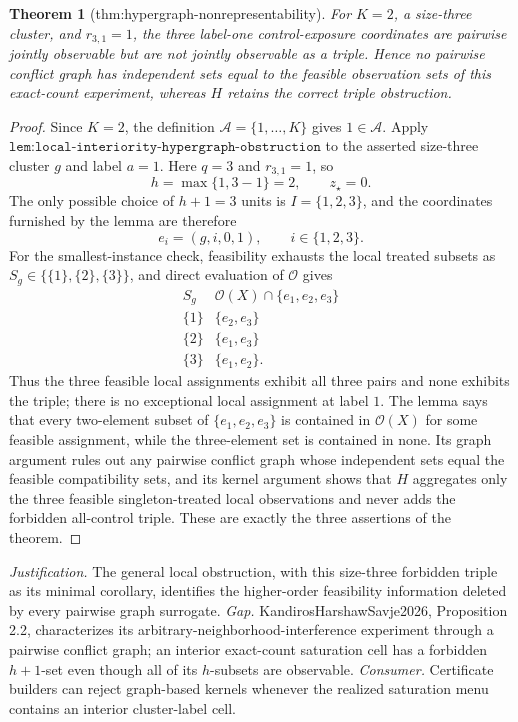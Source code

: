 \documentclass{article}
\newtheorem{theorem}{Theorem}
\begin{document}
\begin{theorem}[thm:hypergraph-nonrepresentability]\label{thm:hypergraph-nonrepresentability}
For \(K=2\), a size-three cluster, and \(r_{3,1}=1\), the three label-one control-exposure coordinates are pairwise jointly observable but are not jointly observable as a triple. Hence no pairwise conflict graph has independent sets equal to the feasible observation sets of this exact-count experiment, whereas \(H\) retains the correct triple obstruction.
\end{theorem}
\begin{proof}
Since \(K=2\), the definition \(\mathcal A=\{1,\ldots,K\}\) gives \(1\in\mathcal A\).  Apply \(\texttt{lem:local-interiority-hypergraph-obstruction}\) to the asserted size-three cluster \(g\) and label \(a=1\).  Here \(q=3\) and \(r_{3,1}=1\), so
\[
 h=\max\{1,3-1\}=2,
 \qquad z_\star=0.
\]
The only possible choice of \(h+1=3\) units is \(I=\{1,2,3\}\), and the coordinates furnished by the lemma are therefore
\[
 e_i=(g,i,0,1),\qquad i\in\{1,2,3\}.
\]
For the smallest-instance check, feasibility exhausts the local treated subsets as \(S_g\in\{\{1\},\{2\},\{3\}\}\), and direct evaluation of \(\mathcal O\) gives
\[
\begin{array}{c|c}
S_g&\mathcal O(X)\cap\{e_1,e_2,e_3\}\\ \hline
\{1\}&\{e_2,e_3\}\\
\{2\}&\{e_1,e_3\}\\
\{3\}&\{e_1,e_2\}.
\end{array}
\]
Thus the three feasible local assignments exhibit all three pairs and none exhibits the triple; there is no exceptional local assignment at label \(1\).
The lemma says that every two-element subset of \(\{e_1,e_2,e_3\}\) is contained in \(\mathcal O(X)\) for some feasible assignment, while the three-element set is contained in none.  Its graph argument rules out any pairwise conflict graph whose independent sets equal the feasible compatibility sets, and its kernel argument shows that \(H\) aggregates only the three feasible singleton-treated local observations and never adds the forbidden all-control triple.  These are exactly the three assertions of the theorem.
\end{proof}
\par\smallskip\noindent \textit{Justification.} The general local obstruction, with this size-three forbidden triple as its minimal corollary, identifies the higher-order feasibility information deleted by every pairwise graph surrogate. \textit{Gap.} KandirosHarshawSavje2026, Proposition 2.2, characterizes its arbitrary-neighborhood-interference experiment through a pairwise conflict graph; an interior exact-count saturation cell has a forbidden \(h+1\)-set even though all of its \(h\)-subsets are observable. \textit{Consumer.} Certificate builders can reject graph-based kernels whenever the realized saturation menu contains an interior cluster-label cell.
\end{document}
